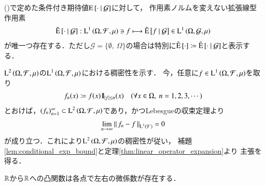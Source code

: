 	\begin{screen}
		\begin{thm}[条件付き期待値の拡張]
			()で定めた条件付き期待値$\operatorname{E} \left[ \cdot \ \middle|\ \mathcal{G} \right]$に対して，
			作用素ノルムを変えない拡張線型作用素
			\begin{align}
				\tilde{\operatorname{E}} \left[ \cdot \ \middle|\ \mathcal{G} \right]:\operatorname{L}^{1} \left(\Omega,\mathcal{F},\mu\right) \ni f \longmapsto \tilde{\operatorname{E}} \left[ f \ \middle|\ \mathcal{G} \right] \in \operatorname{L}^{1} \left(\Omega,\mathcal{G},\mu\right)
			\end{align}
			が唯一つ存在する．ただし$\mathcal{G} = \{\emptyset,\ \Omega\}$の場合は特別に$\tilde{\operatorname{E}} \left[ \cdot \right] \coloneqq \tilde{\operatorname{E}} \left[ \cdot \ \middle|\ \mathcal{G} \right]$と表示する．
			\label{thm:conditional_exp_expansion}
		\end{thm}
	\end{screen}
	
	\begin{prf}	
		$\operatorname{L}^{2} \left(\Omega,\mathcal{F},\mu\right)$の$\operatorname{L}^{1} \left(\Omega,\mathcal{F},\mu\right)$における稠密性を示す．
		今，任意に$f \in \operatorname{L}^{1} \left(\Omega,\mathcal{F},\mu\right)$を取り
		\begin{align}
			f_n(x) \coloneqq f(x) \mbox{1}\hspace{-0.25em}\mbox{l}_{|f| \leq n} (x) \quad (\forall x \in \Omega,\ n=1,2,3,\cdots) \label{conditional_exp_expansion}
		\end{align}
		とおけば，$(f_n)_{n=1}^{\infty} \subset \operatorname{L}^{2} \left(\Omega,\mathcal{F},\mu\right)$であり，かつLebesgueの収束定理より
		\begin{align}
			\lim_{n \to \infty} \left\|\, f_n - f\, \right\|_{\operatorname{L}^{1} \left(\mathcal{F}\right)} = 0
		\end{align}
		が成り立つ．これにより$\operatorname{L}^{2} \left(\Omega,\mathcal{F},\mu\right)$の稠密性が従い，
		補題\ref{lem:conditional_exp_bound}と定理\ref{thm:linear_operator_expansion}より
		主張を得る．
		\QED
	\end{prf}
	
	\begin{screen}
		\begin{lem}[凸関数は片側微分可能]
			$\mathbb{R}$から$\mathbb{R}$への凸関数は各点で左右の微係数が存在する．
			\label{lem:convex_function_measurability}
		\end{lem}
	\end{screen}
	
